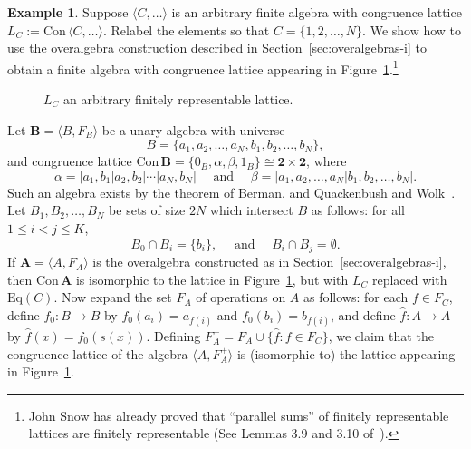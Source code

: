 \documentclass[cm,dissertation]{uhthesis}
\theoremstyle{plain}
\theoremstyle{definition}
\newtheorem{example}[theorem]{Example}
\newcounter{claim}
\theoremstyle{remark}
\numberwithin{theorem}{section}
\numberwithin{claim}{chapter}
\numberwithin{equation}{section}
\numberwithin{conjecture}{chapter}
\newcommand{\<}{\ensuremath{\langle}}
\renewcommand{\>}{\ensuremath{\rangle}}
\renewcommand{\leq}{\ensuremath{\leqslant}}
\newcommand{\Eq}{\ensuremath{\mathrm{Eq}}}
\newcommand{\Con}{\ensuremath{\mathrm{Con\,}}}
\newcommand{\0}{\ensuremath{\mathbf{0}}}
\newcommand{\1}{\ensuremath{\mathbf{1}}}
\newcommand{\2}{\ensuremath{\mathbf{2}}}
\newcommand{\3}{\ensuremath{\mathbf{3}}}
\newcommand{\4}{\ensuremath{\mathbf{4}}}
\newcommand{\5}{\ensuremath{\mathbf{5}}}
\newcommand{\bA}{\ensuremath{\mathbf{A}}}
\newcommand{\bB}{\ensuremath{\mathbf{B}}}
\newcommand{\two}{\ensuremath{\mathbf{2}}}
\begin{document}
  \begin{example}
    \label{ex:conclusion}
    Suppose $\<C, \dots\>$ is an arbitrary finite algebra with congruence lattice 
    $L_C := \Con \<C, \dots\>$. Relabel the elements so that $C = \{1, 2, \dots, N\}$.
    We show how to use the overalgebra construction described in
    Section~\ref{sec:overalgebras-i} to obtain a finite algebra with congruence
    lattice appearing in Figure~\ref{fig:conclusion}.\footnote{John
      Snow 
      has already proved that ``parallel sums'' of finitely representable
      lattices are finitely representable (See Lemmas 3.9 and 3.10
      of~\cite{Snow:2000}).
    }

    \begin{figure}[h!]
      \centering
      \caption{%
        $L_C$ an arbitrary finitely 
        representable lattice.}
      \label{fig:conclusion}
    \end{figure}

    Let $\bB = \<B, F_B\>$  be a unary algebra with universe 
    \[
    B = \{a_1, a_2, \dots, a_N, b_1, b_2, \dots, b_N \},
    \]
    and congruence lattice
    $\Con\bB = \{0_B, \alpha, \beta, 1_B\} \cong \two \times \two$, where
    \[
    \alpha = |a_1, b_1 | a_2, b_2 | \cdots | a_N, b_N | \quad \text{ and } \quad
    \beta = |a_1, a_2, \dots, a_N | b_1, b_2, \dots, b_N |.
    \]
    Such an algebra exists by the theorem of Berman\cite{Berman:1970}, and Quackenbush and
    Wolk~\cite{Quack:1971}.
    Let $B_1, B_2, \dots, B_N$ be sets of size $2N$ which intersect $B$ as
    follows:
    for all $1 \leq i < j \leq K$,
    \[
    B_0\cap B_i = \{b_i\}, \quad \text{ and } \quad B_i \cap B_j = \emptyset.
    \]
    If $\bA = \< A, F_A\>$ is the overalgebra constructed as in
    Section~\ref{sec:overalgebras-i}, then $\Con \bA$ is isomorphic to the lattice
    in Figure~\ref{fig:conclusion}, but with $L_C$ replaced with $\Eq(C)$.  Now
    expand the set $F_A$ of operations on $A$ as follows: for each $f\in F_C$,
    define $f_0: B\rightarrow B$ by $f_0(a_i) = a_{f(i)}$ and 
    $f_0(b_i) = b_{f(i)}$, and define $\hat{f}: A\rightarrow A$ by $\hat{f}(x) =
    f_0(s(x))$. Defining $F^+_A = F_A \cup \{\hat{f} : f\in F_C\}$, we claim that
    the congruence lattice of the algebra $\< A, F^+_A\>$ is (isomorphic to) the
    lattice appearing in Figure~\ref{fig:conclusion}.
  \end{example}
\end{document}
